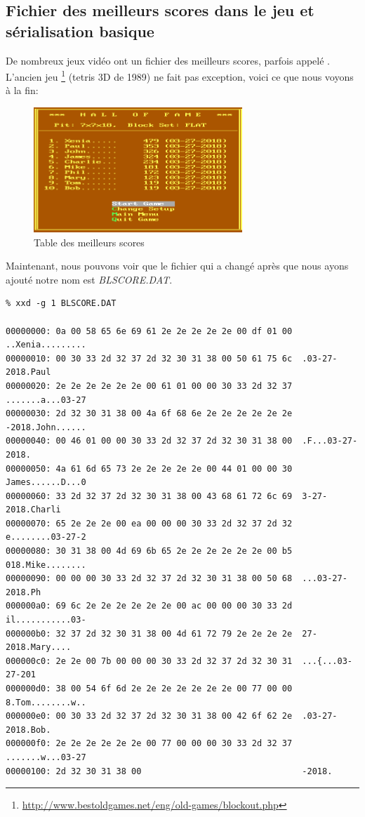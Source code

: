 \subsection{Fichier des meilleurs scores dans le jeu  et sérialisation basique}

De nombreux jeux vidéo ont un fichier des meilleurs scores, parfois appelé .
L'ancien jeu \footnote{\url{http://www.bestoldgames.net/eng/old-games/blockout.php}}
(tetris 3D de 1989) ne fait pas exception, voici ce que nous voyons à la fin:

\begin{figure}[H]
\centering
\includegraphics[width=0.7\textwidth]{advanced/550_more_structs/blockout/hs.png}
\caption{Table des meilleurs scores}
\end{figure}

Maintenant, nous pouvons voir que le fichier qui a changé après que nous ayons ajouté
notre nom est \emph{BLSCORE.DAT}.

\begin{lstlisting}
% xxd -g 1 BLSCORE.DAT

00000000: 0a 00 58 65 6e 69 61 2e 2e 2e 2e 2e 00 df 01 00  ..Xenia.........
00000010: 00 30 33 2d 32 37 2d 32 30 31 38 00 50 61 75 6c  .03-27-2018.Paul
00000020: 2e 2e 2e 2e 2e 2e 00 61 01 00 00 30 33 2d 32 37  .......a...03-27
00000030: 2d 32 30 31 38 00 4a 6f 68 6e 2e 2e 2e 2e 2e 2e  -2018.John......
00000040: 00 46 01 00 00 30 33 2d 32 37 2d 32 30 31 38 00  .F...03-27-2018.
00000050: 4a 61 6d 65 73 2e 2e 2e 2e 2e 00 44 01 00 00 30  James......D...0
00000060: 33 2d 32 37 2d 32 30 31 38 00 43 68 61 72 6c 69  3-27-2018.Charli
00000070: 65 2e 2e 2e 00 ea 00 00 00 30 33 2d 32 37 2d 32  e........03-27-2
00000080: 30 31 38 00 4d 69 6b 65 2e 2e 2e 2e 2e 2e 00 b5  018.Mike........
00000090: 00 00 00 30 33 2d 32 37 2d 32 30 31 38 00 50 68  ...03-27-2018.Ph
000000a0: 69 6c 2e 2e 2e 2e 2e 2e 00 ac 00 00 00 30 33 2d  il...........03-
000000b0: 32 37 2d 32 30 31 38 00 4d 61 72 79 2e 2e 2e 2e  27-2018.Mary....
000000c0: 2e 2e 00 7b 00 00 00 30 33 2d 32 37 2d 32 30 31  ...{...03-27-201
000000d0: 38 00 54 6f 6d 2e 2e 2e 2e 2e 2e 2e 00 77 00 00  8.Tom........w..
000000e0: 00 30 33 2d 32 37 2d 32 30 31 38 00 42 6f 62 2e  .03-27-2018.Bob.
000000f0: 2e 2e 2e 2e 2e 2e 00 77 00 00 00 30 33 2d 32 37  .......w...03-27
00000100: 2d 32 30 31 38 00                                -2018.
\end{lstlisting}

